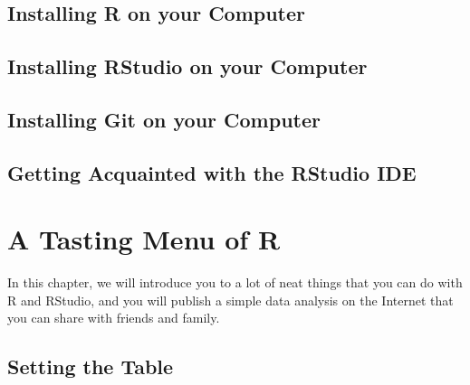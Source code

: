 \documentclass[]{book}
\begin{document}
\hypertarget{installing-r-on-your-computer}{%
\section{Installing R on your Computer}\label{installing-r-on-your-computer}}

\hypertarget{installing-rstudio-on-your-computer}{%
\section{Installing RStudio on your Computer}\label{installing-rstudio-on-your-computer}}

\hypertarget{installing-git-on-your-computer}{%
\section{Installing Git on your Computer}\label{installing-git-on-your-computer}}

\hypertarget{getting-acquainted-with-the-rstudio-ide}{%
\section{Getting Acquainted with the RStudio IDE}\label{getting-acquainted-with-the-rstudio-ide}}

\hypertarget{a-tasting-menu-of-r}{%
\chapter{A Tasting Menu of R}\label{a-tasting-menu-of-r}}

In this chapter, we will introduce you to a lot of neat things that you can do with R and RStudio, and you will publish a simple data analysis on the Internet
that you can share with friends and family.

\hypertarget{setting-the-table}{%
\section{Setting the Table}\label{setting-the-table}}
\end{document}
